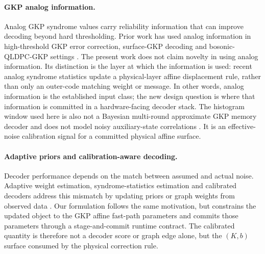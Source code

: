 \documentclass[11pt]{article}
\begin{document}
\paragraph{GKP analog information.}
Analog GKP syndrome values carry reliability information that can improve
decoding beyond hard thresholding.  Prior work has used analog information in
high-threshold GKP error correction, surface-GKP decoding and
bosonic-QLDPC-GKP settings \cite{fukui2018,noh2020,noh2022,raveendran2022,
berent2024,borah2025}.  The present work does not claim novelty in using
analog information.  Its distinction is the layer at which the information is
used: recent analog syndrome statistics update a physical-layer affine
displacement rule, rather than only an outer-code matching weight or message.
In other words, analog information is the established input class; the new
design question is where that information is committed in a hardware-facing
decoder stack.
The histogram window used here is also not a Bayesian multi-round approximate
GKP memory decoder and does not model noisy auxiliary-state correlations
\cite{wan2020,roy2025}.  It is an effective-noise calibration signal for a
committed physical affine surface.

\paragraph{Adaptive priors and calibration-aware decoding.}
Decoder performance depends on the match between assumed and actual noise.
Adaptive weight estimation, syndrome-statistics estimation and calibrated
decoders address this mismatch by updating priors or graph weights from
observed data \cite{spitz2018,wagner2021,dgr2023,chen2022,sivak2024}.  Our
formulation follows the same motivation, but constrains the updated object to
the GKP affine fast-path parameters and commits those parameters through a
stage-and-commit runtime contract.  The calibrated quantity is therefore not a
decoder score or graph edge alone, but the \((K,b)\) surface consumed by the
physical correction rule.
\end{document}
